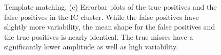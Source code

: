 \begin{center}
\begin{figure}[h!]
\begin{subfigure}[b]{.33\textwidth}
\caption{}
\label{truewaveforms}
\end{subfigure}
\caption{Template matching.
(c) Errorbar plots of the true positives and the false positives in the IC cluster.  While the false positives have slightly more variability, the mean shape for the false positives and the true positives is nearly identical.  The true misses have a significantly lower amplitude as well as high variability. 
} \label{fig:IC-PCA}
\end{figure}
\end{center}

















